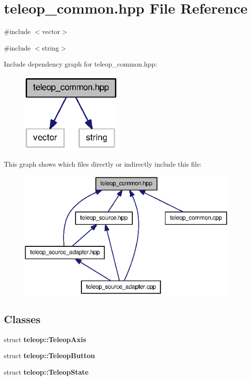 \section{teleop\_\-common.hpp File Reference}
\label{teleop__common_8hpp}
{\ttfamily \#include $<$vector$>$}\par
{\ttfamily \#include $<$string$>$}\par
Include dependency graph for teleop\_\-common.hpp:
\nopagebreak
\begin{figure}[H]
\begin{center}
\leavevmode
\includegraphics[width=148pt]{teleop__common_8hpp__incl}
\end{center}
\end{figure}
This graph shows which files directly or indirectly include this file:
\nopagebreak
\begin{figure}[H]
\begin{center}
\leavevmode
\includegraphics[width=385pt]{teleop__common_8hpp__dep__incl}
\end{center}
\end{figure}
\subsection*{Classes}
\begin{DoxyCompactItemize}
\item 
struct {\bf teleop::TeleopAxis}
\item 
struct {\bf teleop::TeleopButton}
\item 
struct {\bf teleop::TeleopState}
\end{DoxyCompactItemize}
